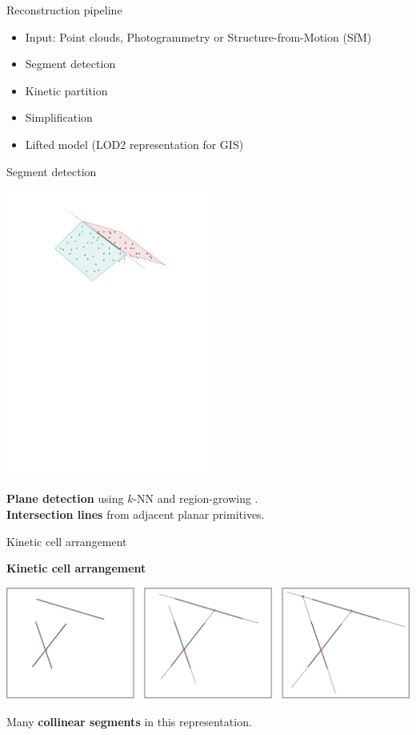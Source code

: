 \begin{frame}{Reconstruction pipeline}
	\begin{itemize}
		\item Input: Point clouds, Photogrammetry or Structure-from-Motion (SfM)
		\item Segment detection
		\item Kinetic partition
		\item Simplification
		\item Lifted model (LOD2 representation for GIS)
	\end{itemize}
\end{frame}

\begin{frame}{Segment detection}
	\begin{center}
		\includegraphics[width=0.5\textwidth]{plane_detection}
	\end{center}
	\textbf{Plane detection} using $k$-NN and region-growing \cite{feng_FastPlaneExtraction_2014, holz_FastRangeImage_2013, rabbani_SegmentationPointClouds_2006}.\\
	\textbf{Intersection lines} from adjacent planar primitives.\\
\end{frame}

\begin{frame}{Kinetic cell arrangement}
	
	\textbf{Kinetic cell arrangement} \cite{bauchet_KIPPIKIneticPolygonal_2018}
	\vspace{0.5cm}
	
	\includegraphics[width=\linewidth]{kinetic}

	Many \textbf{collinear segments} in this representation.
\end{frame}


